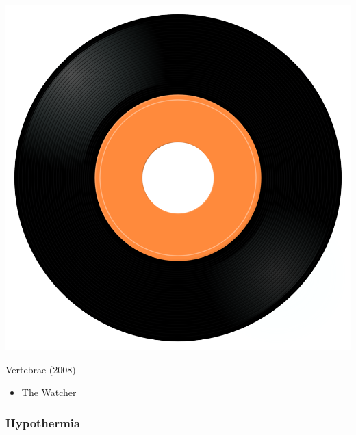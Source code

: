 \begin{minipage}[t]{0.25\textwidth}\vspace{0pt}
\captionsetup{type=figure}
\includegraphics[width=\textwidth]{Images/cover.png}
\caption*{Vertebrae (2008)}
\end{minipage}
\begin{minipage}[t]{0.25\textwidth}\vspace{0pt}
\begin{itemize}[nosep,leftmargin=1em,labelwidth=*,align=left]
	\setlength{\itemsep}{0pt}
	\item The Watcher
\end{itemize}
\end{minipage}

\subsubsection{Hypothermia}

